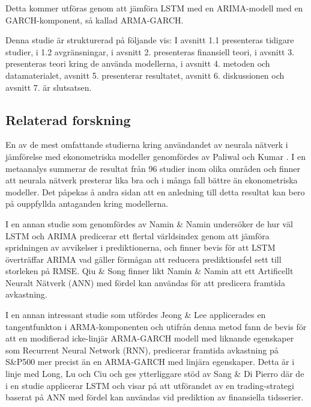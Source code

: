 \documentclass[11pt]{article}
\numberwithin{equation}{section}
\numberwithin{table}{section}
\numberwithin{figure}{section}
\begin{document}
Detta kommer utföras genom att jämföra LSTM med en ARIMA-modell med en GARCH-komponent, så kallad ARMA-GARCH. 

Denna studie är strukturerad på följande vis: I avsnitt 1.1 presenteras tidigare studier, i 1.2 avgränsningar, i avsnitt 2. presenteras finansiell teori, i avsnitt 3. presenteras teori kring de använda modellerna, i avsnitt 4. metoden och datamaterialet, avsnitt 5. presenterar resultatet, avsnitt 6. diskussionen och avsnitt 7. är slutsatsen. 

\subsection{Relaterad forskning}

En av de mest omfattande studierna kring användandet av neurala nätverk i jämförelse med ekonometriska modeller genomfördes av Paliwal och Kumar \parencite*{paliwal2009neural}. I en metaanalys summerar de resultat från 96 studier inom olika områden och finner att neurala nätverk presterar lika bra och i många fall bättre än ekonometriska modeller. Det påpekas å andra sidan att en anledning till detta resultat kan bero på ouppfyllda antaganden kring modellerna. 

I en annan studie som genomfördes av Namin \& Namin \parencite*{siaminamini2018forecasting} undersöker de hur väl LSTM och ARIMA predicerar ett flertal världsindex genom att jämföra spridningen av avvikelser i prediktionerna, och finner bevis för att LSTM överträffar ARIMA vad gäller förmågan att reducera prediktionsfel sett till storleken på RMSE. Qiu \& Song \parencite*{10.1371/journal.pone.0155133} finner likt Namin \& Namin \parencite*{siaminamini2018forecasting} att ett Artificellt Neuralt Nätverk (ANN) med fördel kan användas för att predicera framtida avkastning.

I en annan intressant studie som utfördes Jeong \& Lee \parencite*{jeong2019recurrent} applicerades en tangentfunkton i ARMA-komponenten och utifrån denna metod fann de bevis för att en modifierad icke-linjär ARMA-GARCH modell med liknande egenskaper som Recurrent Neural Network (RNN), predicerar framtida avkastning på S\&P500 mer precist än en ARMA-GARCH med linjära egenskaper. Detta är i linje med Long, Lu och Ciu \parencite*{long2019deep} och ges ytterliggare stöd av Sang \& Di Pierro \parencite*{sang2019improving} där de i en studie applicerar LSTM och visar på att utförandet av en trading-strategi baserat på ANN med fördel kan användas vid prediktion av finansiella tidsserier. 
\end{document}
